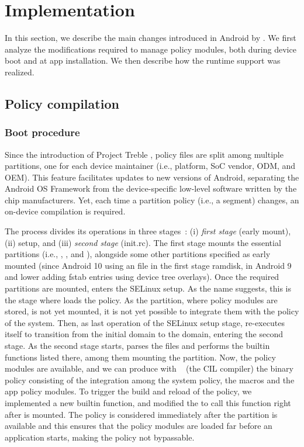 \section{Implementation}\label{sect:seapp_implementation}

In this section, we describe the main changes introduced in Android by
\seapp.  We first analyze the modifications required to manage policy
modules, both during device boot and at app installation.  We then
describe how the runtime support was realized.

\subsection{Policy compilation}\label{sect:seapp_syst_impl}

\subsubsection{Boot procedure}

Since the introduction of Project Treble \cite{seapp_treble}, policy
files are split among multiple partitions, one for each device
maintainer (i.e., platform, SoC vendor, ODM, and OEM).  This feature
facilitates updates to new versions of Android, separating the Android
OS Framework from the device-specific low-level software written by
the chip manufacturers.  Yet, each time a partition policy (i.e., a
segment) changes, an on-device compilation is required.

The \init process divides its operations in three
stages~\cite{seapp_initstages}: (i) {\em first stage} (early mount),
(ii) \sel setup, and (iii) {\em second stage} (init.rc).  The first
stage mounts the essential partitions (i.e., \dev, \proc, \sys and
\selinuxfsfull), alongside some other partitions specified as early
mounted (since Android 10 using an \fstab file in the first stage
ramdisk, in Android 9 and lower adding fstab entries using device tree
overlays).  Once the required partitions are mounted, \init enters the
SELinux setup.  As the name suggests, this is the stage where \init
loads the \sel policy.  As the \data partition, where policy modules
are stored, is not yet mounted, it is not yet possible to integrate
them with the policy of the system.  Then, as last operation of the
SELinux setup stage, \init re-executes itself to transition from the
initial  domain to the \initdomain domain, entering the second
stage.  As the second stage starts, \init parses the \initrc files and
performs the builtin functions listed there, among them mounting the
\data partition.  Now, the policy modules are available, and we can
produce with \secilc~\cite{seapp_secilccom} (the \sel CIL compiler)
the binary policy consisting of the integration among the system
policy, the \seapp macros and the app policy modules.  To trigger the
build and reload of the policy, we implemented a new builtin function,
and modified the \initrc to call this function right after \data is
mounted.  The policy is considered immediately after the \data
partition is available and this ensures that the policy modules are
loaded far before an application starts, making the policy not
bypassable.

